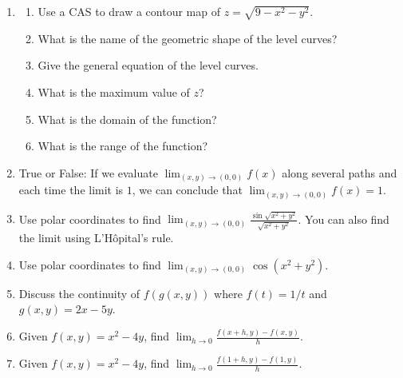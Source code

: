 \documentclass{exercises}
\begin{document}
\begin{enumerate}[resume]
\item \techrequired
\begin{enumerate}[label=(\alph*)]
  \item Use a CAS to draw a contour map of $z=\sqrt{9-x^{2}-y^{2}}$.
  \item What is the name of the geometric shape of the level curves?
  \item Give the general equation of the level curves.
  \item What is the maximum value of $z$?
  \item What is the domain of the function?
  \item What is the range of the function?
\end{enumerate}
\item True or False: If we evaluate $\lim_{(x,y)\to(0,0)}f(x)$ along several paths and each time the limit is $1$, we can conclude that $\lim_{(x,y)\to(0,0)}f(x)=1$.
\item Use polar coordinates to find $\lim_{(x,y)\to(0,0)}\frac{\sin \sqrt{x^{2}+y^{2}}}{\sqrt{x^{2}+y^{2}}}$. You can also find the limit using L'Hôpital's rule.
\item Use polar coordinates to find $\lim_{(x,y)\to(0,0)}\cos(x^{2}+y^{2})$.
\item Discuss the continuity of $f(g(x,y))$ where $f(t)=1/t$ and $g(x,y)=2x-5y$.
\item Given $f(x,y)=x^{2}-4y$, find $\lim_{h\to0}\frac{f(x+h,y)-f(x,y)}{h}$.
\item Given $f(x,y)=x^{2}-4y$, find $\lim_{h\to0}\frac{f(1+h,y)-f(1,y)}{h}$.
\end{enumerate}
\end{document}

